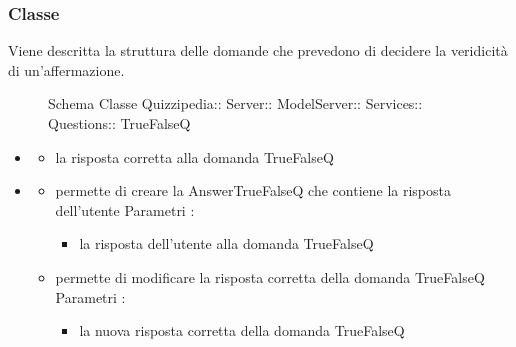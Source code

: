 \subsubsection{Classe }
Viene descritta la struttura delle domande che prevedono di decidere la veridicità di un'affermazione.
\begin{figure}[H]
\centering
\noindent{}
\caption[Schema Classe TrueFalseQ]{Schema Classe Quizzipedia:: Server:: ModelServer:: Services:: Questions:: TrueFalseQ}
\end{figure}
\begin{itemize}
\item {}
\begin{itemize}
\item {}
\newline
la risposta corretta alla domanda TrueFalseQ
\end{itemize}
\item {}
\begin{itemize}
\item {}
\newline
permette di creare la AnswerTrueFalseQ che contiene la risposta dell'utente
\newline
Parametri :
\begin{itemize}
\item {}
\newline
la risposta dell'utente alla domanda TrueFalseQ
\end{itemize}
\item {}
\newline
permette di modificare la risposta corretta della domanda TrueFalseQ
\newline
Parametri :
\begin{itemize}
\item {}
\newline
la nuova risposta corretta della domanda TrueFalseQ
\end{itemize}
\end{itemize}
\end{itemize}
